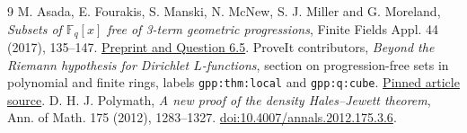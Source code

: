 \documentclass[11pt]{article}
\begin{document}
\begin{thebibliography}{9}
 M. Asada, E. Fourakis, S. Manski, N. McNew, S. J. Miller and G. Moreland,
\emph{Subsets of $\mathbb F_q[x]$ free of 3-term geometric progressions}, Finite Fields Appl. 44 (2017), 135--147. \href{https://arxiv.org/abs/1512.01932}{Preprint and Question 6.5}.
 ProveIt contributors, \emph{Beyond the Riemann hypothesis for Dirichlet $L$-functions}, section on progression-free sets in polynomial and finite rings, labels \texttt{gpp:thm:local} and \texttt{gpp:q:cube}. \href{https://github.com/VladimirReshetnikov/ProveIt/blob/ff96fd44ab160e65fb8a9d861243828d07c156cf/Analysis/GeneralizedRiemannHypothesis/Article/sections/gpp.tex}{Pinned article source}.
 D. H. J. Polymath, \emph{A new proof of the density Hales--Jewett theorem}, Ann. of Math. 175 (2012), 1283--1327. \href{https://doi.org/10.4007/annals.2012.175.3.6}{doi:10.4007/annals.2012.175.3.6}.
\end{thebibliography}
\end{document}
